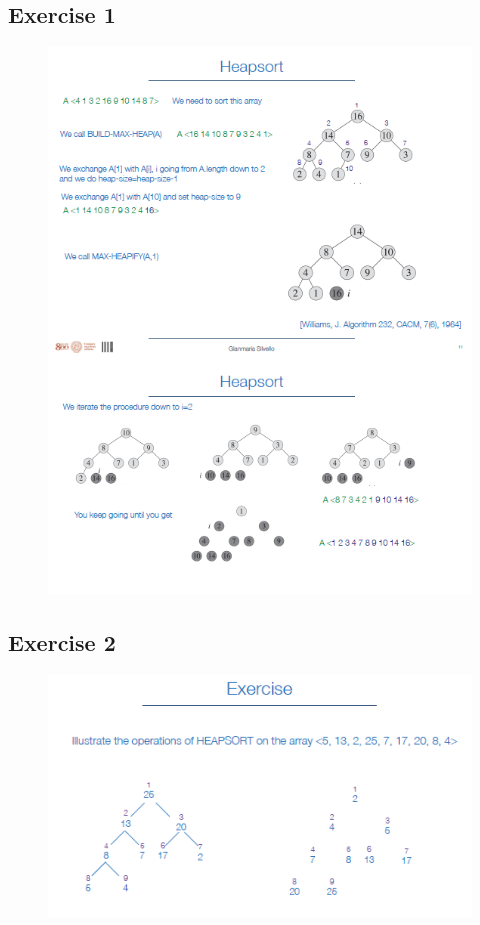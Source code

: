 \subsection{Exercise 1}
    \begin{figure}[h!]
        \centering
        \includegraphics[width=1\linewidth]{immagini/heap5.png}
    \end{figure}
\newpage
\subsection{Exercise 2}
    \begin{figure}[h!]
        \centering
        \includegraphics[width=0.8\linewidth]{immagini/heap6.png}
    \end{figure}


